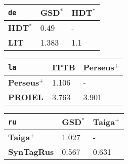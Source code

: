 \begin{minipage}{0.485\textwidth}
    \end{minipage}
    \hfill
    \begin{minipage}{0.45\textwidth}
    \begin{table}[H]
    \begin{tabular}{|l|l|l|}
    \hline
    \texttt{de} & \textbf{GSD$^{*}$} & \textbf{HDT$^{*}$} \\
    \hline
    \textbf{HDT$^{*}$} & \cellcolor{green!25}0.49 & - \\
    \hline
    \textbf{LIT} & \cellcolor{gray!25}1.383 & \cellcolor{gray!25}1.1 \\
    \hline
    \end{tabular}
    \end{table}
    
    \begin{table}[H]
    \begin{tabular}{|l|l|l|}
    \hline
    \texttt{la} & \textbf{ITTB} & \textbf{Perseus}$^{+}$ \\
    \hline
    \textbf{Perseus}$^{+}$ & \cellcolor{green!25}1.106 & - \\
    \hline
    \textbf{PROIEL} & \cellcolor{red!25}3.763 & \cellcolor{green!25}3.901 \\
    \hline
    \end{tabular}
    \end{table}
    
    \begin{table}[H]
    \end{table}
    
    \begin{table}[H]
    \begin{tabular}{|l|l|l|}
    \hline
    \texttt{ru} & \textbf{GSD$^{*}$} & \textbf{Taiga}$^{+}$ \\
    \hline
    \textbf{Taiga$^{+}$} & \cellcolor{green!25}1.027 & - \\
    \hline
    \textbf{SynTagRus} & \cellcolor{gray!25}0.567 & \cellcolor{green!25}0.631 \\
    \hline
    \end{tabular}
    \end{table}
    \end{minipage}
    

